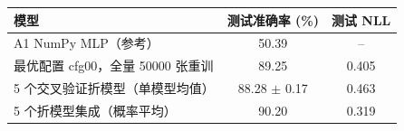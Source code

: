 \begin{tabular}{lcc}
\toprule
模型 & 测试准确率 (\%) & 测试 NLL \\
\midrule
A1 NumPy MLP（参考） & 50.39 & -- \\
最优配置 cfg00，全量 50000 张重训 & 89.25 & 0.405 \\
5 个交叉验证折模型（单模型均值） & 88.28 $\pm$ 0.17 & 0.463 \\
5 个折模型集成（概率平均） & 90.20 & 0.319 \\
\bottomrule
\end{tabular}
